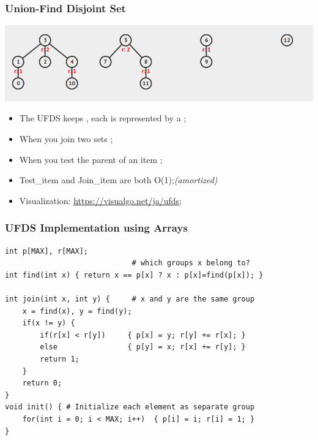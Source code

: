 \begin{frame}
  \frametitle{Union-Find Disjoint Set}

  \begin{center}
    \includegraphics[width=.9\textwidth]{img/ufds1}
  \end{center}

  \begin{itemize}
  \item The UFDS keeps , each is represented by a ;
  \item When you join two sets ;
  \item When you test the parent of an item ;
  \item Test\_item and Join\_item are both O(1);\hfill \emph{(amortized)}
  \item Visualization: \url{https://visualgo.net/ja/ufds};
  \end{itemize}
\end{frame}

\begin{frame}[fragile]
  \frametitle{UFDS Implementation using Arrays}

  {\small
\begin{verbatim}
int p[MAX], r[MAX];
                             # which groups x belong to?
int find(int x) { return x == p[x] ? x : p[x]=find(p[x]); }

int join(int x, int y) {     # x and y are the same group
    x = find(x), y = find(y);
    if(x != y) {
        if(r[x] < r[y])     { p[x] = y; r[y] += r[x]; }
        else                { p[y] = x; r[x] += r[y]; }
        return 1;
    }
    return 0;
}
void init() { # Initialize each element as separate group
    for(int i = 0; i < MAX; i++)  { p[i] = i; r[i] = 1; }
}
\end{verbatim}
}

\end{frame}
